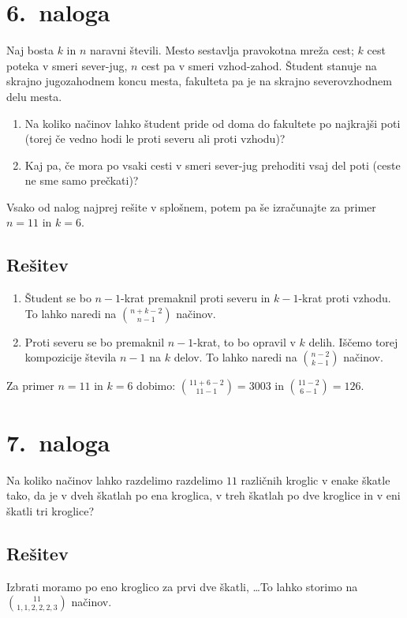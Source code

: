 \documentclass[11pt]{article}
\begin{document}
\section*{6.~naloga}
Naj bosta \(k\) in \(n\) naravni števili. Mesto sestavlja pravokotna mreža cest; \(k\) cest poteka v
smeri sever-jug, \(n\) cest pa v smeri vzhod-zahod. Študent stanuje na skrajno jugozahodnem
koncu mesta, fakulteta pa je na skrajno severovzhodnem delu mesta.
\begin{enumerate}[label=(\alph*)]
    \item Na koliko načinov lahko študent pride od doma do fakultete po najkrajši poti (torej
    če vedno hodi le proti severu ali proti vzhodu)?
    \item Kaj pa, če mora po vsaki cesti v smeri sever-jug prehoditi vsaj del poti (ceste ne
    sme samo prečkati)?
\end{enumerate}
Vsako od nalog najprej rešite v splošnem, potem pa še izračunajte za primer \(n = 11\) in
\(k = 6\).

\subsection*{Rešitev}
\begin{enumerate}[label=(\alph*)]
    \item Študent se bo \(n-1\)-krat premaknil proti severu in \(k-1\)-krat proti vzhodu. To lahko naredi na \(\binom{n+k-2}{n-1}\) načinov.
    \item Proti severu se bo premaknil \(n-1\)-krat, to bo opravil v \(k\) delih. Iščemo torej kompozicije števila \(n-1\) na \(k\) delov.
        To lahko naredi na \(\binom{n-2}{k-1}\) načinov.
\end{enumerate}
Za primer \(n = 11\) in \(k = 6\) dobimo: \(\binom{11 + 6 - 2}{11 - 1} = 3003\) in \(\binom{11 - 2}{6 - 1} = 126\).

\section*{7.~naloga}
Na koliko načinov lahko razdelimo razdelimo \(11\) različnih kroglic v enake škatle tako, da
je v dveh škatlah po ena kroglica, v treh škatlah po dve kroglice in v eni škatli tri kroglice?

\subsection*{Rešitev}
Izbrati moramo po eno kroglico za prvi dve škatli, \dots To lahko storimo na \(\binom{11}{1, 1, 2, 2, 2, 3}\) načinov.
\end{document}
